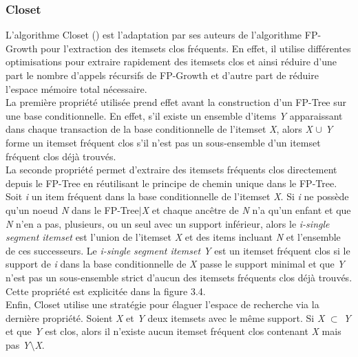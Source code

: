 \documentclass[a4paper,10pt]{report}
\begin{document}
\subsubsection{Closet}
\hspace{0.15cm}L'algorithme Closet (\cite{PEI00}) est l'adaptation par ses auteurs de l'algorithme FP-Growth pour l'extraction des itemsets clos fréquents. En effet, il utilise différentes optimisations pour extraire rapidement des itemsets clos et ainsi réduire d'une part le nombre d'appels récursifs de FP-Growth et d'autre part de réduire l'espace mémoire total nécessaire. \\

\hspace{0.15cm}La première propriété utilisée prend effet avant la construction d'un FP-Tree sur une base conditionnelle. En effet, s'il existe un ensemble d'items \emph{Y} apparaissant dans chaque transaction de la base conditionnelle de l'itemset \emph{X}, alors \emph{X} $\cup$ \emph{Y} forme un itemset fréquent clos s'il n'est pas un sous-ensemble d'un itemset fréquent clos déjà trouvés. \\

\hspace{0.15cm}La seconde propriété permet d'extraire des itemsets fréquents clos directement depuis le FP-Tree en réutilisant le principe de chemin unique dans le FP-Tree.  Soit \emph{i} un item fréquent dans la base conditionnelle de l'itemset \emph{X}. Si \emph{i} ne possède qu'un noeud \emph{N} dans le FP-Tree$|$\emph{X} et chaque ancêtre de \emph{N} n'a qu'un enfant et que \emph{N} n'en a pas, plusieurs, ou un seul avec un support inférieur, alors le \emph{i-single segment itemset} est l'union de l'itemset \emph{X} et des items incluant \emph{N} et l'ensemble de ces successeurs. Le \emph{i-single segment itemset Y} est un itemset fréquent clos si le support de \emph{i} dans la base conditionnelle de \emph{X} passe le support minimal et que \emph{Y} n'est pas un sous-ensemble strict d'aucun des itemsets fréquents clos déjà trouvés. Cette propriété est explicitée dans la figure 3.4.\\

\hspace{0.15cm}Enfin, Closet utilise une stratégie pour élaguer l'espace de recherche via la dernière propriété. Soient \emph{X} et \emph{Y} deux itemsets avec le même support. Si \emph{X} $\subset$ \emph{Y} et que \emph{Y} est clos, alors il n'existe aucun itemset fréquent clos contenant \emph{X} mais pas \emph{Y}$\setminus$\emph{X}.
\end{document}

